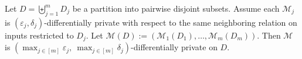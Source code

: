 Let $D = \biguplus_{j=1}^m D_j$ be a partition into pairwise disjoint subsets. Assume each $\mathcal{M}_j$ is $(\varepsilon_j,\delta_j)$-differentially private with respect to the same neighboring relation on inputs restricted to $D_j$. Let $\mathcal{M}(D) :=(\mathcal{M}_1(D_1),\ldots,\mathcal{M}_m(D_m))$. Then $\mathcal{M}$ is $(\max_{j \in [m]}\varepsilon_j,\ \max_{j \in [m]}\delta_j)$-differentially private on $D$.